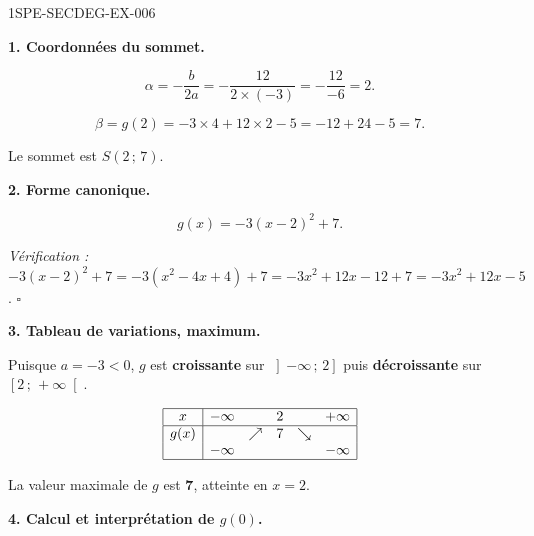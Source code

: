 \begin{corrige}{1SPE-SECDEG-EX-006}

\textbf{1. Coordonnées du sommet.}


\[\alpha = -\frac{b}{2a} = -\frac{12}{2 \times (-3)} = -\frac{12}{-6} = 2.\]

\[\beta = g(2) = -3 \times 4 + 12 \times 2 - 5 = -12 + 24 - 5 = 7.\]

Le sommet est $S(2\,;\,7)$.

\medskip
\textbf{2. Forme canonique.}


\[\boxed{g(x) = -3(x-2)^2 + 7.}\]

\textit{Vérification :} $-3(x-2)^2 + 7 = -3(x^2-4x+4)+7 = -3x^2+12x-12+7 = -3x^2+12x-5$. \hfill $\square$

\medskip
\textbf{3. Tableau de variations, maximum.}


Puisque $a = -3 < 0$, $g$ est \textbf{croissante} sur $\left]-\infty\,;\,2\right]$ puis \textbf{décroissante} sur $\left[2\,;\,+\infty\right[$.

\[
\begin{array}{|c|ccccc|}
\hline
x & -\infty & & 2 & & +\infty \\
\hline
g(x) & & \nearrow & 7 & \searrow & \\
 & -\infty & & & & -\infty \\
\hline
\end{array}
\]

La valeur maximale de $g$ est $\mathbf{7}$, atteinte en $x = 2$.

\medskip
\textbf{4. Calcul et interprétation de $g(0)$.}


\end{corrige}
